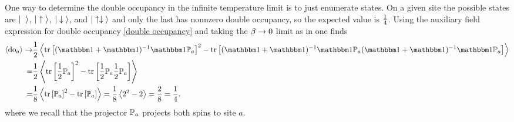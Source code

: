 One way to determine the double occupancy in the infinite temperature limit is to just enumerate states.
On a given site the possible states are $\ket{\null}$, $\left|\;\uparrow\;\right\rangle$, $\left|\;\downarrow\;\right\rangle$, and $\left|\;\uparrow\downarrow\;\right\rangle$ and only the last has nonnzero double occupancy, so the expected value is $\frac{1}{4}$.
Using the auxiliary field expression for double occupancy \eqref{double occupancy} and taking the $\beta\rightarrow0$ limit as in  one finds
\begin{align}
    \expectation{\doubleOccupancy_a}
    \goesto&
    \half\expectation{\tr{(\one + \one)\inverse \one \PP_a}^2 - \tr{(\one+\one)\inverse \one \PP_a (\one+\one)\inverse \one \PP_a}}
    \nonumber\\
    =&
    \half\expectation{\tr{\oneover{2} \PP_a}^2 - \tr{\oneover{2} \PP_a \oneover{2} \PP_a}}
    \nonumber\\
    =&
    \oneover{8}\expectation{\tr{\PP_a}^2 - \tr{\PP_a}}
    =
    \oneover{8}\expectation{ 2^2 - 2 } = \frac{2}{8} = \frac{1}{4}.
\end{align}
where we recall that the projector $\mathbb{P}_a$ projects both spins to site $a$.

